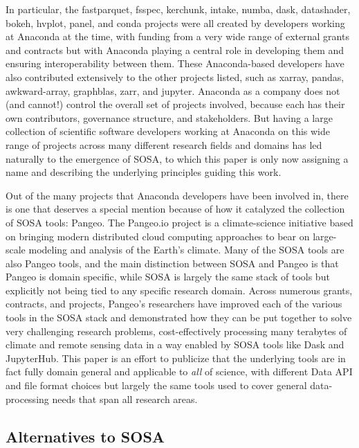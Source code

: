 In particular, the fastparquet, fsspec, kerchunk, intake, numba, dask, datashader, bokeh, hvplot, panel, and conda projects were all created by developers working at Anaconda at the time, with funding from a very wide range of external grants and contracts but with Anaconda playing a central role in developing them and ensuring interoperability between them. These Anaconda-based developers have also contributed extensively to the other projects listed, such as xarray, pandas, awkward-array, graphblas, zarr, and jupyter. Anaconda as a company does not (and cannot!) control the overall set of projects involved, because each has their own contributors, governance structure, and stakeholders. But having a large collection of scientific software developers working at Anaconda on this wide range of projects across many different research fields and domains has led naturally to the emergence of SOSA, to which this paper is only now assigning a name and describing the underlying principles guiding this work.

Out of the many projects that Anaconda developers have been involved in, there is one that deserves a special mention because of how it catalyzed the collection of SOSA tools: Pangeo. The Pangeo.io project is a climate-science initiative based on bringing modern distributed cloud computing approaches to bear on large-scale modeling and analysis of the Earth's climate. Many of the SOSA tools are also Pangeo tools, and the main distinction between SOSA and Pangeo is that Pangeo is domain specific, while SOSA is largely the same stack of tools but explicitly not being tied to any specific research domain. Across numerous grants, contracts, and projects, Pangeo's researchers have improved each of the various tools in the SOSA stack and demonstrated how they can be put together to solve very challenging research problems, cost-effectively processing many terabytes of climate and remote sensing data in a way enabled by SOSA tools like Dask and JupyterHub. This paper is an effort to publicize that the underlying tools are in fact fully domain general and applicable to \emph{all} of science, with different Data API and file format choices but largely the same tools used to cover general data-processing needs that span all research areas.

\subsection{Alternatives to SOSA}

